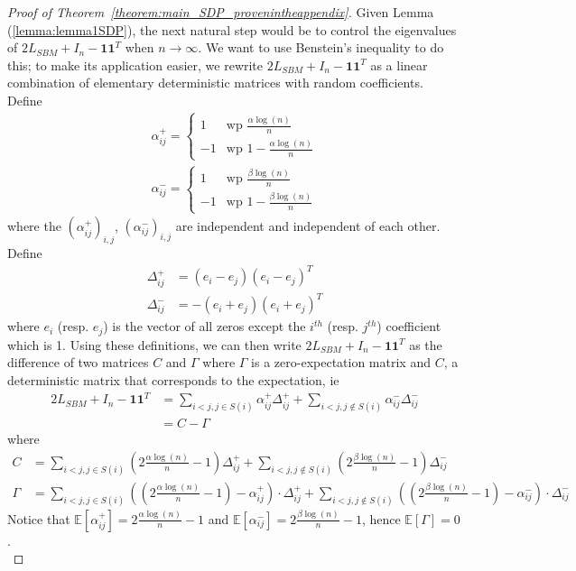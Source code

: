 \documentclass[english]{article}
\newcommand{\1}{\textbf{1}}
\newcommand{\A}{\frac{\alpha \log(n)}{n}}
\newcommand{\B}{\frac{\beta \log(n)}{n}}
\newcommand{\ap}{\alpha^+_{ij}}
\newcommand{\am}{\alpha^-_{ij}}
\newcommand{\E}{\mathbb{E}}
\begin{document}
\begin{proof}[Proof of Theorem~\ref{theorem:main_SDP_provenintheappendix}]


Given Lemma (\ref{lemma:lemma1SDP}), the next natural step would be to control the eigenvalues of $ 2L_{SBM} +I_n-\1\1^T$  when $n \rightarrow \infty$. We want to use Benstein's inequality to do this; to make its application easier, we rewrite $2L_{SBM} +I_n-\1\1^T$ as a linear combination of elementary deterministic matrices with random coefficients.
Define
\begin{align}
\alpha^+_{ij}=\begin{cases} 1 & \text{wp }\A \\ -1 & \text{wp } 1-\A \end{cases}\\
\alpha^-_{ij}=\begin{cases} 1 & \text{wp }\B \\ -1 & \text{wp } 1-\B \end{cases}
\end{align}
where the $(\alpha_{ij}^+)_{i,j}$, $(\alpha_{ij}^-)_{i,j}$  are independent and independent of each other.
Define
\begin{align}
\Delta^+_{ij}&= (e_i-e_j)(e_i-e_j)^T\\
\Delta^-_{ij}&=-(e_i+e_j)(e_i+e_j)^T
\end{align}
where $e_i$ (resp. $e_j$) is the vector of all zeros except the $i^{th}$ (resp. $j^{th}$) coefficient which is 1. 
Using these definitions, we can then write $2L_{SBM} +I_n-\1\1^T$ as the difference of two matrices $C$ and $\Gamma$ where $\Gamma$ is a zero-expectation matrix and $C$, a deterministic matrix that corresponds to the expectation, ie
\begin{align}
2L_{SBM} +I_n-\1\1^T &= \sum_{i<j, j \in S(i)} \alpha^+_{ij} \Delta^+_{ij}+\sum_{i<j, j \notin S(i)} \alpha^-_{ij} \Delta^-_{ij}\\
&= C - \Gamma
\end{align}
where
\begin{align}
C &=  \sum_{i<j, j \in S(i)}\left(2\A-1\right)\Delta^+_{ij}+\sum_{i<j, j \notin S(i)} \left(2\B-1\right) \Delta^-_{ij}\\
\Gamma &=  \sum_{i<j, j \in S(i)}\left(\left(2\A-1\right) - \alpha^{+}_{ij}\right) \cdot \Delta^+_{ij} + \sum_{i<j, j \notin S(i)} \left(\left(2\B-1\right) - \alpha^{-}_{ij}\right) \cdot \Delta^-_{ij}
\end{align}
Notice that $\E[\ap]=2\A-1$ and $\E[\am]=2\B-1$, hence $\E[ \Gamma]=0$.\\


\end{proof}
\end{document}
